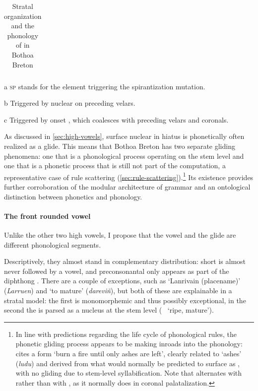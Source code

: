 \begin{table}
\begin{threeparttable}
{\begin{tabular}{llccccccc}
\bottomrule
  \end{tabular}}
  \caption{Stratal organization and the phonology of \ipa{[i]} in Bothoa Breton}
  \label{tab:i-levels-bothoa}
\begin{tablenotes}
\item[a] \textsc{sp} stands for the element triggering the spirantization mutation.
\item[b] Triggered by nuclear \ipa{[i]} on preceding velars.
\item[c] Triggered by onset \ipa{[i]}, which coalesces with preceding velars and coronals.
\end{tablenotes}
\end{threeparttable}
\end{table}

As discussed in \cref{sec:high-vowels}, surface nuclear \ipa{[i]} in hiatus is phonetically often realized as a glide. This means that Bothoa Breton has two separate gliding phenomena: one that is a phonological process operating on the stem level and one that is a phonetic process that is still not part of the computation, a representative case of rule scattering (\cref{sec:rule-scattering}).\footnote{In line with  predictions regarding the life cycle of phonological rules, the phonetic gliding process appears to be making inroads into the phonology: \citet{humphreys95:_phonol_bothoa_saint_nicol_pelem} cites a form \mbox{\ipa{[ˈlyːdʒənad̥]}} `burn a fire until only ashes are left', clearly related to \ipa{[ˈlyːdy]} `ashes' (\emph{ludu}) and derived from what would normally be predicted to surface as \ipa{[ˈlyːdyənad]}, with no gliding due to stem-level syllabification. Note that \ipa{[d]} alternates with \ipa{[dʒ]} rather than with \ipa{[ʒ]}, as it normally does in coronal palatalization.} Its existence provides further corroboration of the modular architecture of grammar and an ontological distinction between phonetics and phonology.

\paragraph{The front rounded vowel}
\label{sec:front-rounded-vowel}

Unlike the other two high vowels, I propose that the vowel \ipa{[y]} and the glide \ipa{[ɥ]} are different phonological segments.

Descriptively, they almost stand in complementary distribution: short \ipa{[y]} is almost never followed by a vowel, and preconsonantal \ipa{[ɥ]} only appears as part of the diphthong \ipa{[əɥ]}. There are a couple of exceptions, such as \ipa{[ˈlaːryən]} `Lanrivain (placename)' (\emph{Larruen}) and \ipa{[ˈdaːryo]} `to mature' (\emph{dareviñ}), but both of these are explainable in a stratal model: the first is monomorphemic and thus possibly exceptional, in the second the \ipa{[y]} is parsed as a nucleus at the stem level (\cf\ \ipa{[ˈdaːry]} `ripe, mature').

